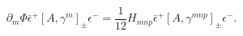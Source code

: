 \begin{equation}
   \partial_m\Phi {\bar\epsilon^+}[A,\gamma^m]_\pm\epsilon^-
      =\frac{1}{12}H_{mnp}
          {\bar\epsilon^+}[A,\gamma^{mnp}]_\pm\epsilon^- .
\end{equation}

